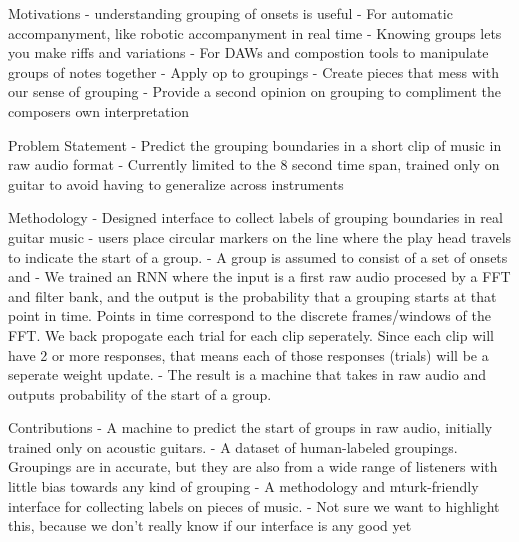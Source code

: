 Motivations
 - understanding grouping of onsets is useful
   - For automatic accompanyment, like robotic accompanyment in real time
   - Knowing groups lets you make riffs and variations
   - For DAWs and compostion tools to manipulate groups of notes together
     - Apply op to groupings
     - Create pieces that mess with our sense of grouping
     - Provide a second opinion on grouping to compliment the composers own interpretation

Problem Statement
 - Predict the grouping boundaries in a short clip of music in raw audio format
 - Currently limited to the 8 second time span, trained only on guitar to avoid having to generalize across instruments

Methodology
 - Designed interface to collect labels of grouping boundaries in real guitar music
   - users place circular markers on the line where the play head travels to indicate the start of a group.
   - A group is assumed to consist of a set of onsets and
   - We trained an RNN where the input is a first raw audio procesed by a FFT and filter bank, and the output is the probability that a grouping starts at that point in time. Points in time correspond to the discrete frames/windows of the FFT. We back propogate each trial for each clip seperately. Since each clip will have 2 or more responses, that means each of those responses (trials) will be a seperate weight update.
   - The result is a machine that takes in raw audio and outputs probability of the start of a group.

Contributions
 - A machine to predict the start of groups in raw audio, initially trained only on acoustic guitars.
 - A dataset of human-labeled groupings. Groupings are in accurate, but they are also from a wide range of listeners with little bias towards any kind of grouping
 - A methodology and mturk-friendly interface for collecting labels on pieces of music.
   - Not sure we want to highlight this, because we don't really know if our interface is any good yet
